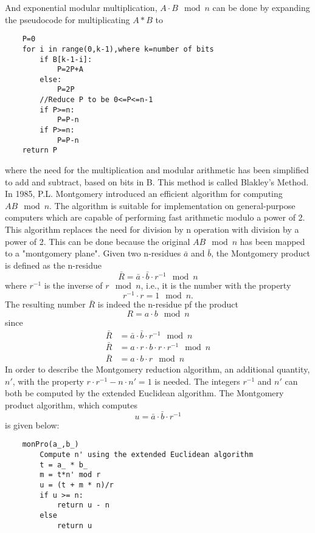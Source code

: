And exponential modular multiplication, $A\cdot B\mod{n}$ can be done by expanding the pseudocode for multiplicating $A*B$ to
\begin{lstlisting}
    P=0
    for i in range(0,k-1),where k=number of bits
        if B[k-1-i]:
            P=2P+A
        else:
            P=2P
        //Reduce P to be 0<=P<=n-1
        if P>=n:
            P=P-n
        if P>=n:
            P=P-n
    return P
\end{lstlisting}
%
where the need for the multiplication and modular arithmetic has been simplified to add and subtract, based on bits in B. This method is called Blakley's Method. 
%
In 1985, P.L. Montgomery introduced an efficient algorithm for computing $AB\mod{n}$. The algorithm is suitable for implementation on general-purpose computers which are capable of performing fast arithmetic modulo a power of 2. This algorithm replaces the need for division by n operation with division by a power of 2. This can be done because the original $AB\mod{n}$ has been mapped to a "montgomery plane". Given two n-residues $\bar{a}$ and $\bar{b}$, the Montgomery product is defined as the n-residue
%
\begin{equation}
    \bar{R}=\bar{a} \cdot \bar{b} \cdot r^{-1} \mod{n}
\end{equation}
%
where $r^{-1}$ is the inverse of $r\mod{n}$, i.e., it is the number with the property
%
\begin{equation}
    r^{-1} \cdot r=1\mod{n}.
\end{equation}
%
The resulting number $\bar{R}$ is indeed the n-residue pf the product
%
\begin{equation}
    R=a \cdot b\mod{n}   
\end{equation}
%
since
%
\begin{align}
    \bar{R} &=\bar{a} \cdot \bar{b} \cdot r^{-1} \mod{n}\\
    \bar{R} &=a\cdot r \cdot b \cdot r \cdot r^{-1} \mod{n}\\
    \bar{R} &=a\cdot b \cdot r \mod{n}
\end{align}
%
In order to describe the Montgomery reduction algorithm, an additional quantity, $n'$, with the property $r \cdot r^{-1} -n \cdot n' =1$ is needed. The integers $r^{-1}$ and $n'$ can both be computed by the extended Euclidean algorithm. The Montgomery product algorithm, which computes
\begin{equation}
    u=\bar{a} \cdot \bar{b} \cdot r^{-1}
\end{equation}
is given below:
\begin{lstlisting}
    monPro(a_,b_)
        Compute n' using the extended Euclidean algorithm
        t = a_ * b_
        m = t*n' mod r
        u = (t + m * n)/r
        if u >= n:
            return u - n
        else
            return u
\end{lstlisting}
